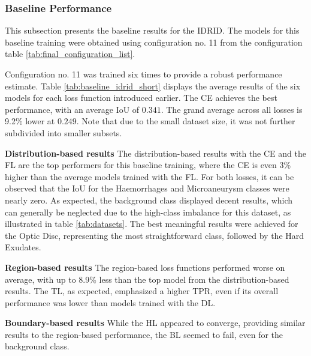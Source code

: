\subsubsection*{Baseline Performance}
\label{subsubsec:baseline_performance_idrid}
This subsection presents the baseline results for the \ac{IDRID}. The models for this baseline training were obtained using configuration no. 11 from the configuration table \ref{tab:final_configuration_list}. 

Configuration no. 11 was trained six times to provide a robust performance estimate. Table \ref{tab:baseline_idrid_short} displays the average results of the six models for each loss function introduced earlier. The \ac{CE} achieves the best performance, with an average \ac{IoU} of $0.341$. The grand average across all losses is 9.2\% lower at $0.249$. Note that due to the small dataset size, it was not further subdivided into smaller subsets.

\textbf{Distribution-based results}\newline
The distribution-based results with the \ac{CE} and the \ac{FL} are the top performers for this baseline training, where the \ac{CE} is even 3\% higher than the average models trained with the \ac{FL}. For both losses, it can be observed that the \ac{IoU} for the Haemorrhages and Microaneurysm classes were nearly zero. As expected, the background class displayed decent results, which can generally be neglected due to the high-class imbalance for this dataset, as illustrated in table \ref{tab:datasets}. The best meaningful results were achieved for the Optic Disc, representing the most straightforward class, followed by the Hard Exudates.

\textbf{Region-based results}\newline
The region-based loss functions performed worse on average, with up to 8.9\% less than the top model from the distribution-based results. The \ac{TL}, as expected, emphasized a higher \ac{TPR}, even if its overall performance was lower than models trained with the \ac{DL}.

\textbf{Boundary-based results}\newline
While the \ac{HL} appeared to converge, providing similar results to the region-based performance, the \ac{BL} seemed to fail, even for the background class.


